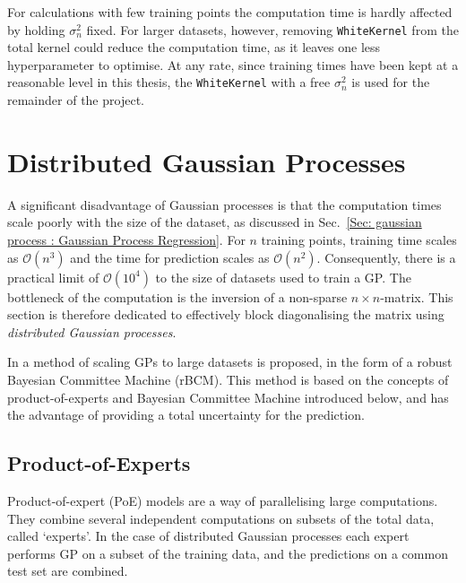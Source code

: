 \documentclass[twoside,english]{uiofysmaster}
\begin{document}
{{For calculations with few training points the computation time is hardly affected by holding $\sigma_n^2$ fixed. For larger datasets, however, removing \verb|WhiteKernel| from the total kernel could reduce the computation time, as it leaves one less hyperparameter to optimise. At any rate, since training times have been kept at a reasonable level in this thesis, the \verb|WhiteKernel| with a free $\sigma_n^2$ is used for the remainder of the project.



  







\section{Distributed Gaussian Processes}\label{Sec:: gaussian process : Distributed Gaussian Processes}



A significant disadvantage of Gaussian processes is that the computation times scale poorly with the size of the dataset, as discussed in Sec.~\ref{Sec: gaussian process : Gaussian Process Regression}. For $n$ training points, training time scales as $\mathcal{O}(n^3)$ and the time for prediction scales as $\mathcal{O}(n^2)$. Consequently, there is a practical limit of $\mathcal{O}(10^4)$ to the size of datasets used to train a GP. The bottleneck of the computation is the inversion of a non-sparse $n \times n$-matrix. This section is therefore dedicated to effectively block diagonalising the matrix using \textit{distributed Gaussian processes}.

In \cite{deisenroth2015distributed} a method of scaling GPs to large datasets is proposed, in the form of a robust Bayesian Committee Machine (rBCM). This method is based on the concepts of product-of-experts and Bayesian Committee Machine introduced below, and has the advantage of providing a total uncertainty for the prediction.


\subsection{Product-of-Experts}

Product-of-expert (PoE) models are a way of parallelising large computations. They combine several independent computations on subsets of the total data, called `experts'. In the case of distributed Gaussian processes each expert performs GP on a subset of the training data, and the predictions on a common test set are combined. 

}}
\end{document}
